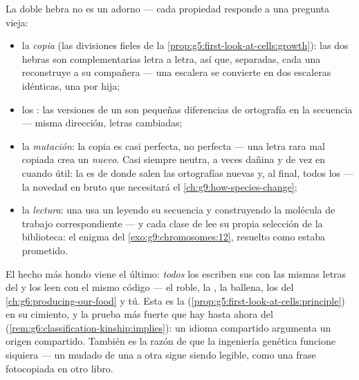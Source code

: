 \begin{proposition}\label{prop:g9:genes-and-dna:explains}
La doble hebra no es un adorno --- cada propiedad responde a una
pregunta vieja:
\begin{itemize}
  \item la \emph{copia} (las divisiones fieles de la
        \cref{prop:g5:first-look-at-cells:growth}): las dos hebras son
        complementarias letra a letra, así que, separadas, cada una
        reconstruye a su compañera --- una escalera se convierte en dos
        escaleras idénticas, una por  hija;
  \item los \emph{}: las versiones de un  son pequeñas
        diferencias de ortografía en la secuencia --- misma dirección,
        letras cambiadas;
  \item la \emph{mutación}: la copia es casi perfecta,
        no perfecta --- una letra rara mal copiada crea un 
        \emph{nuevo}. Casi siempre neutra, a veces dañina y de vez en
        cuando útil: la  es de donde salen las ortografías
        nuevas y, al final, todos los  --- la novedad en bruto
        que necesitará el \cref{ch:g9:how-species-change};
  \item la \emph{lectura}: una  usa un  leyendo su secuencia y
        construyendo la molécula de trabajo correspondiente --- y cada
        clase de  lee su propia selección de la biblioteca: el
        enigma del \cref{exo:g9:chromosomes:12}, resuelto como estaba
        prometido.
\end{itemize}
\end{proposition}
\admitted

\begin{remark}\label{rem:g9:genes-and-dna:universal}
El hecho más hondo viene el último: \emph{todos} los 
escriben sus  con las mismas letras del  y los leen con el
mismo código --- el roble, la , la ballena, los  del
\cref{ch:g6:producing-our-food} y tú. Esta es la 
(\cref{prop:g5:first-look-at-cells:principle}) en su cimiento, y la
prueba más fuerte que hay hasta ahora del 
(\cref{rem:g6:classification-kinship:implies}): un idioma compartido
argumenta un origen compartido. También es la razón de que la
ingeniería genética funcione siquiera --- un  mudado de una 
a otra sigue siendo legible, como una frase fotocopiada en otro libro.
\end{remark}

